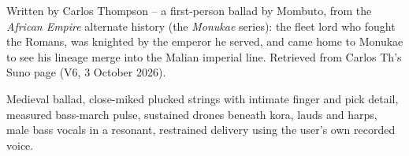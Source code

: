 
\begin{notes}
Written by Carlos Thompson -- a first-person ballad by Mombuto, from the \emph{African Empire} alternate history (the \emph{Monukae} series): the fleet lord who fought the Romans, was knighted by the emperor he served, and came home to Monukae to see his lineage merge into the Malian imperial line. Retrieved from Carlos Th's Suno page (V6, 3 October 2026).
\end{notes}
\begin{style}
Medieval ballad, close-miked plucked strings with intimate finger and pick detail, measured bass-march pulse, sustained drones beneath kora, lauds and harps, male bass vocals in a resonant, restrained delivery using the user's own recorded voice.
\end{style}
